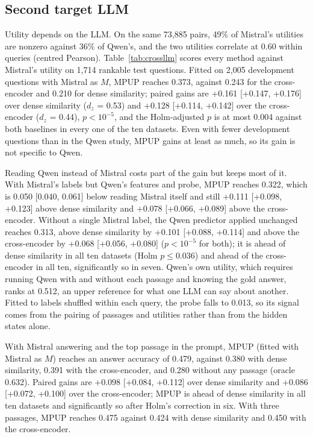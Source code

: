 \documentclass[preprint,12pt,authoryear]{elsarticle}
\begin{document}
\subsection{Second target LLM}\label{sec:crossllm}
Utility depends on the LLM. On the same 73,885 pairs, 49\% of Mistral's utilities are nonzero against 36\% of Qwen's, and the two utilities correlate at 0.60 within queries (centred Pearson). Table~\ref{tab:crossllm} scores every method against Mistral's utility on 1,714 rankable test questions. Fitted on 2,005 development questions with Mistral as $M$, MPUP reaches 0.373, against 0.243 for the cross-encoder and 0.210 for dense similarity; paired gains are +0.161 [+0.147, +0.176] over dense similarity ($d_z$ = 0.53) and +0.128 [+0.114, +0.142] over the cross-encoder ($d_z$ = 0.44), $p < 10^{-5}$, and the Holm-adjusted $p$ is at most 0.004 against both baselines in every one of the ten datasets. Even with fewer development questions than in the Qwen study, MPUP gains at least as much, so its gain is not specific to Qwen.

Reading Qwen instead of Mistral costs part of the gain but keeps most of it. With Mistral's labels but Qwen's features and probe, MPUP reaches 0.322, which is 0.050 [0.040, 0.061] below reading Mistral itself and still +0.111 [+0.098, +0.123] above dense similarity and +0.078 [+0.066, +0.089] above the cross-encoder. Without a single Mistral label, the Qwen predictor applied unchanged reaches 0.313, above dense similarity by +0.101 [+0.088, +0.114] and above the cross-encoder by +0.068 [+0.056, +0.080] ($p < 10^{-5}$ for both); it is ahead of dense similarity in all ten datasets (Holm $p \le 0.036$) and ahead of the cross-encoder in all ten, significantly so in seven. Qwen's own utility, which requires running Qwen with and without each passage and knowing the gold answer, ranks at 0.512, an upper reference for what one LLM can say about another. Fitted to labels shuffled within each query, the probe falls to 0.013, so its signal comes from the pairing of passages and utilities rather than from the hidden states alone.

With Mistral answering and the top passage in the prompt, MPUP (fitted with Mistral as $M$) reaches an answer accuracy of 0.479, against 0.380 with dense similarity, 0.391 with the cross-encoder, and 0.280 without any passage (oracle 0.632). Paired gains are +0.098 [+0.084, +0.112] over dense similarity and +0.086 [+0.072, +0.100] over the cross-encoder; MPUP is ahead of dense similarity in all ten datasets and significantly so after Holm's correction in six. With three passages, MPUP reaches 0.475 against 0.424 with dense similarity and 0.450 with the cross-encoder.
\end{document}
